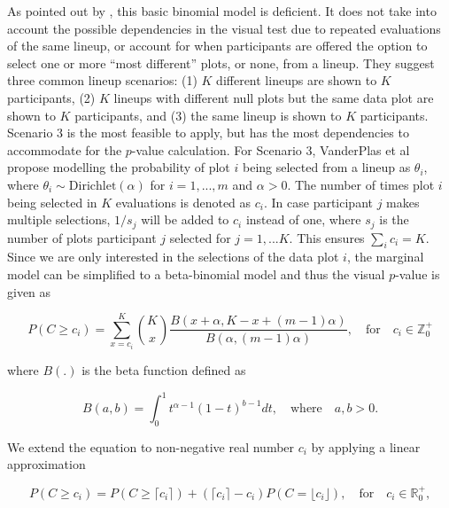 \documentclass[]{interact}
\theoremstyle{plain}%
\theoremstyle{definition}
\theoremstyle{remark}
\begin{document}
As pointed out by \citet{vanderplas2021statistical}, this basic binomial
model is deficient. It does not take into account the possible
dependencies in the visual test due to repeated evaluations of the same
lineup, or account for when participants are offered the option to
select one or more ``most different'' plots, or none, from a lineup.
They suggest three common lineup scenarios: (1) \(K\) different lineups
are shown to \(K\) participants, (2) \(K\) lineups with different null
plots but the same data plot are shown to \(K\) participants, and (3)
the same lineup is shown to \(K\) participants. Scenario 3 is the most
feasible to apply, but has the most dependencies to accommodate for the
\(p\)-value calculation. For Scenario 3, VanderPlas et al propose
modelling the probability of plot \(i\) being selected from a lineup as
\(\theta_i\), where \(\theta_i \sim \text{Dirichlet}(\alpha)\) for
\(i=1,...,m\) and \(\alpha > 0\). The number of times plot \(i\) being
selected in \(K\) evaluations is denoted as \(c_i\). In case participant
\(j\) makes multiple selections, \(1/s_j\) will be added to \(c_i\)
instead of one, where \(s_j\) is the number of plots participant \(j\)
selected for \(j=1,...K\). This ensures \(\sum_{i}c_i=K\). Since we are
only interested in the selections of the data plot \(i\), the marginal
model can be simplified to a beta-binomial model and thus the visual
\(p\)-value is given as

\begin{equation} \label{eq:pvalue-beta-binomial}
P(C \geq c_i) = \sum_{x=c_i}^{K}{K \choose x}\frac{B(x + \alpha, K - x + (m - 1)\alpha)}{B(\alpha, (m-1)\alpha)},\quad \text{for} \quad c_i \in \mathbb{Z}_0^+
\end{equation}

\noindent where \(B(.)\) is the beta function defined as

\begin{equation} \label{eq:betafunction}
B(a, b) = \int_{0}^{1}t^{\alpha - 1}(1-t)^{b-1}dt,\quad \text{where}\quad a,b>0.
\end{equation}

\noindent We extend the equation to non-negative real number \(c_i\) by
applying a linear approximation

\begin{equation} \label{eq:pvalue-beta-binomial-approx}
P(C \geq c_i) = P(C \geq \lceil c_i \rceil) + (\lceil c_i \rceil - c_i) P(C = \lfloor c_i \rfloor), \quad \text{for}\quad c_i \in \mathbb{R}_0^+,
\end{equation}
\end{document}

